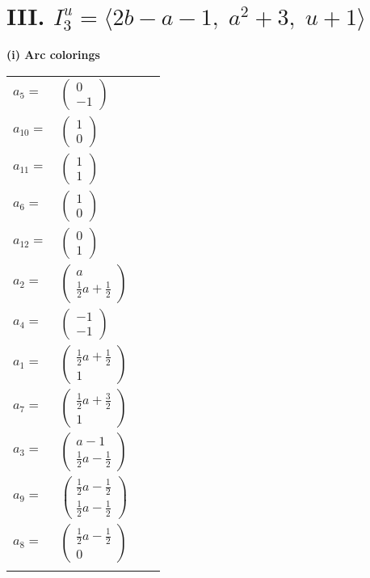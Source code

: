 \documentclass[1p]{elsarticle_modified}
\theoremstyle{definition}
\begin{document}
\centering \section*{III. $I^u_{3}= \langle 2 b- a-1,\;a^2+3,\;u+1 \rangle$}
\flushleft \textbf{(i) Arc colorings}\\
\begin{tabular}{m{7pt} m{180pt} m{7pt} m{180pt} }
\flushright $a_{5}=$&$\begin{pmatrix}0\\-1\end{pmatrix}$ \\
\flushright $a_{10}=$&$\begin{pmatrix}1\\0\end{pmatrix}$ \\
\flushright $a_{11}=$&$\begin{pmatrix}1\\1\end{pmatrix}$ \\
\flushright $a_{6}=$&$\begin{pmatrix}1\\0\end{pmatrix}$ \\
\flushright $a_{12}=$&$\begin{pmatrix}0\\1\end{pmatrix}$ \\
\flushright $a_{2}=$&$\begin{pmatrix}a\\\frac{1}{2} a+\frac{1}{2}\end{pmatrix}$ \\
\flushright $a_{4}=$&$\begin{pmatrix}-1\\-1\end{pmatrix}$ \\
\flushright $a_{1}=$&$\begin{pmatrix}\frac{1}{2} a+\frac{1}{2}\\1\end{pmatrix}$ \\
\flushright $a_{7}=$&$\begin{pmatrix}\frac{1}{2} a+\frac{3}{2}\\1\end{pmatrix}$ \\
\flushright $a_{3}=$&$\begin{pmatrix}a-1\\\frac{1}{2} a-\frac{1}{2}\end{pmatrix}$ \\
\flushright $a_{9}=$&$\begin{pmatrix}\frac{1}{2} a-\frac{1}{2}\\\frac{1}{2} a-\frac{1}{2}\end{pmatrix}$ \\
\flushright $a_{8}=$&$\begin{pmatrix}\frac{1}{2} a-\frac{1}{2}\\0\end{pmatrix}$\\&\end{tabular}
\end{document}

